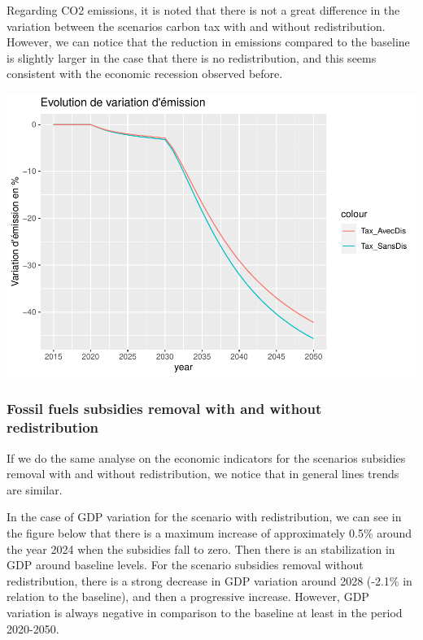 \documentclass[
]{article}
\begin{document}
Regarding CO2 emissions, it is noted that there is not a great
difference in the variation between the scenarios carbon tax with and
without redistribution. However, we can notice that the reduction in
emissions compared to the baseline is slightly larger in the case that
there is no redistribution, and this seems consistent with the economic
recession observed before.

\begin{center}\includegraphics[width=0.7\linewidth,height=0.7\textheight]{Modele-ThreeMe-Tunisie_Sequeira_Valilou_Wang_files/figure-latex/unnamed-chunk-10-1} \end{center}

\hypertarget{fossil-fuels-subsidies-removal-with-and-without-redistribution}{%
\subsubsection{Fossil fuels subsidies removal with and without
redistribution}\label{fossil-fuels-subsidies-removal-with-and-without-redistribution}}

If we do the same analyse on the economic indicators for the scenarios
subsidies removal with and without redistribution, we notice that in
general lines trends are similar.

In the case of GDP variation for the scenario with redistribution, we
can see in the figure below that there is a maximum increase of
approximately 0.5\% around the year 2024 when the subsidies fall to
zero. Then there is an stabilization in GDP around baseline levels. For
the scenario subsidies removal without redistribution, there is a strong
decrease in GDP variation around 2028 (-2.1\% in relation to the
baseline), and then a progressive increase. However, GDP variation is
always negative in comparison to the baseline at least in the period
2020-2050.
\end{document}
